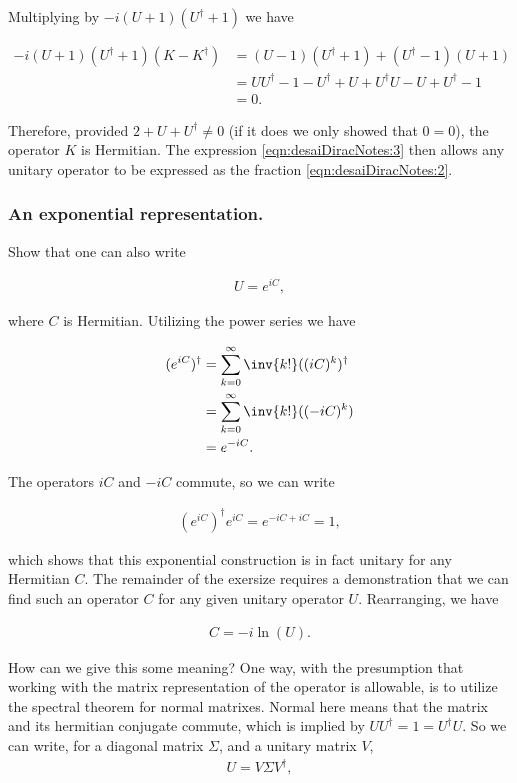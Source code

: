 Multiplying by $-i(U+1)(U^\dagger+1)$ we have

\begin{align*}
-i(U+1)(U^\dagger+1)(K - K^\dagger) 
&= ( U - 1 )(U^\dagger + 1) + ( U^\dagger - 1 )(U + 1) \\
&= U U^\dagger - 1 - U^\dagger + U     + U^\dagger U - U + U^\dagger - 1 \\
&= 0.
\end{align*}

Therefore, provided $2 + U + U^\dagger \ne 0$ (if it does we only showed that $0 = 0$), the operator $K$ is Hermitian.  The expression \ref{eqn:desaiDiracNotes:3} then allows any unitary operator to be expressed as the fraction \ref{eqn:desaiDiracNotes:2}.

\subsubsection{An exponential representation.}

Show that one can also write

\begin{align*}
U = e^{i C},
\end{align*}

where $C$ is Hermitian.  Utilizing the power series we have

\begin{align*}
(e^{iC})^\dagger
&= 
\sum_{k=0}^\infty \inv{k!} ((iC)^k)^\dagger \\
&= 
\sum_{k=0}^\infty \inv{k!} ((-iC)^k) \\
&= 
e^{-iC}.
\end{align*}

The operators $i C$ and $-i C$ commute, so we can write

\begin{align*}
(e^{iC})^\dagger e^{iC} = e^{ -iC + iC } = 1,
\end{align*}

which shows that this exponential construction is in fact unitary for any Hermitian $C$.  The remainder of the exersize requires a demonstration that we can find such an operator $C$ for any given unitary operator $U$.  Rearranging, we have

\begin{align}\label{eqn:desaiDiracNotes:10}
C = -i \ln ( U ).
\end{align}

How can we give this some meaning?  One way, with the presumption that working with the matrix representation of the operator is allowable, is to utilize the spectral theorem for normal matrixes.  Normal here means that the matrix and its hermitian conjugate commute, which is implied by $U U^\dagger = 1 = U^\dagger U$.  So we can write, for a diagonal matrix $\Sigma$, and a unitary matrix $V$, 
\begin{align*}
U = V \Sigma V^\dagger,
\end{align*}


